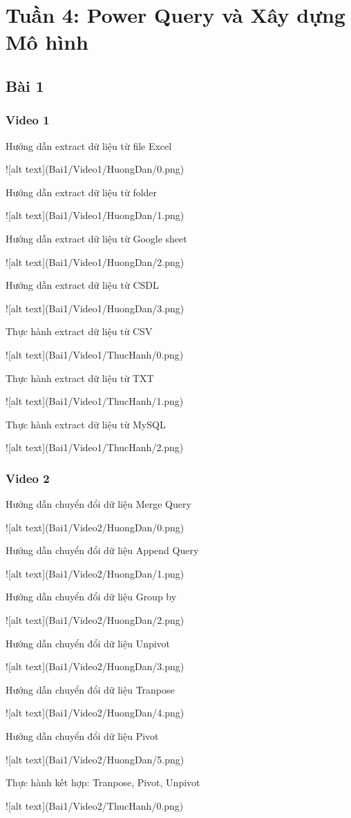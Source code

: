 \documentclass{article}
\begin{document}
\tableofcontents
\newpage
\listoffigures
\newpage
\section{Tuần 4: Power Query và Xây dựng Mô hình}
\subsection{Bài 1}
\subsubsection{Video 1}

\caption{Hướng dẫn extract dữ liệu từ file Excel}
![alt text](Bai1/Video1/HuongDan/0.png)
\caption{Hướng dẫn extract dữ liệu từ folder}
![alt text](Bai1/Video1/HuongDan/1.png)
\caption{Hướng dẫn extract dữ liệu từ Google sheet}
![alt text](Bai1/Video1/HuongDan/2.png)
\caption{Hướng dẫn extract dữ liệu từ CSDL}
![alt text](Bai1/Video1/HuongDan/3.png)

\caption{Thực hành extract dữ liệu từ CSV}
![alt text](Bai1/Video1/ThucHanh/0.png)
\caption{Thực hành extract dữ liệu từ TXT}
![alt text](Bai1/Video1/ThucHanh/1.png)
\caption{Thực hành extract dữ liệu từ MySQL}
![alt text](Bai1/Video1/ThucHanh/2.png)
\subsubsection{Video 2}

\caption{Hướng dẫn chuyển đổi dữ liệu Merge Query}
![alt text](Bai1/Video2/HuongDan/0.png)
\caption{Hướng dẫn chuyển đổi dữ liệu Append Query}
![alt text](Bai1/Video2/HuongDan/1.png)
\caption{Hướng dẫn chuyển đổi dữ liệu Group by}
![alt text](Bai1/Video2/HuongDan/2.png)
\caption{Hướng dẫn chuyển đổi dữ liệu Unpivot}
![alt text](Bai1/Video2/HuongDan/3.png)
\caption{Hướng dẫn chuyển đổi dữ liệu Tranpose}
![alt text](Bai1/Video2/HuongDan/4.png)
\caption{Hướng dẫn chuyển đổi dữ liệu Pivot}
![alt text](Bai1/Video2/HuongDan/5.png)





\caption{Thực hành kết hợp: Tranpose, Pivot, Unpivot}
![alt text](Bai1/Video2/ThucHanh/0.png)
\end{document}
